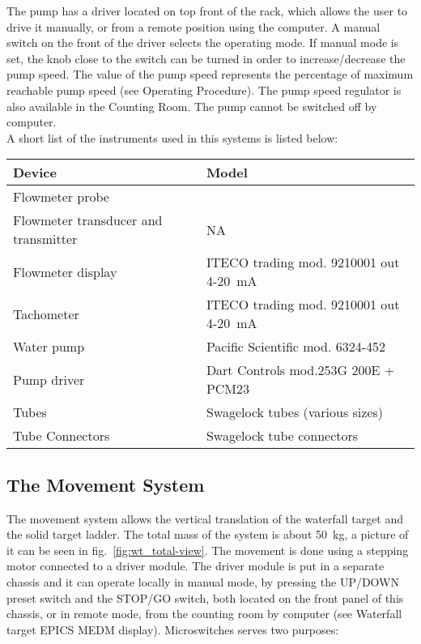 The pump has a driver located on top front of the rack, which allows
the user to drive it manually, or from a remote position using the
computer. A manual switch on the front of the driver selects the operating
mode. If manual mode is set, the knob close to the switch can be turned
in order to increase/decrease the pump speed. The value of the pump
speed represents the percentage of maximum reachable pump speed (see
Operating Procedure). The pump speed regulator is also available in
the Counting Room. The pump cannot be switched off by computer. \\


A short list of the instruments used in this systems is listed below: 

\begin{center}\begin{tabular}{ll}
\hline 
Device &
 Model \\
\hline
Flowmeter probe &
 \\
 Flowmeter transducer and transmitter &
 NA\\
 Flowmeter display &
 ITECO trading mod. 9210001 out 4-20~mA \\
 Tachometer &
 ITECO trading mod. 9210001 out 4-20~mA \\
 Water pump &
 Pacific Scientific mod. 6324-452 \\
 Pump driver &
 Dart Controls mod.253G 200E + PCM23 \\
 Tubes &
 Swagelock tubes (various sizes) \\
 Tube Connectors &
 Swagelock tube connectors  \\
\hline
\end{tabular}\end{center}


\subsection{The Movement System}

The movement system allows the vertical translation of the waterfall
target and the solid target ladder. The total mass of the system is
about 50~kg, a picture of it can be seen in fig.~\ref{fig:wt_total-view}.
The movement is done using a stepping motor connected to a driver
module. The driver module is put in a separate chassis and it can
operate locally in manual mode, by pressing the UP/DOWN preset switch
and the STOP/GO switch, both located on the front panel of this chassis,
or in remote mode, from the counting room by computer (see Waterfall
target EPICS MEDM display). Microswitches serves two purposes: 

